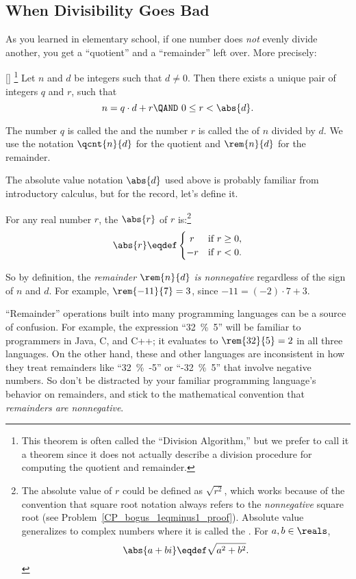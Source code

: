 \subsection{When Divisibility Goes Bad}

As you learned in elementary school, if one number does \emph{not}
evenly divide another, you get a ``quotient'' and a ``remainder'' left
over.  More precisely:
\begin{theorem}\label{division_thm}[]%
\footnote{This theorem is often called the ``Division Algorithm,'' but
  we prefer to call it a theorem since it does not actually describe
  a division procedure for computing the quotient and remainder.}  Let
$n$ and $d$ be integers such that $d \neq 0$.  Then there exists a unique
pair of integers $q$ and $r$, such that
\begin{equation}\label{nqdr}
n = q \cdot d + r \QAND\ 0 \leq r < \abs{d}.
\end{equation}
\end{theorem}
The number $q$ is called the  and the number $r$ is
called the  of $n$ divided by $d$.  We use the
notation $\qcnt{n}{d}$ for the quotient and $\rem{n}{d}$ for the
remainder.

The absolute value notation $\abs{d}$ used above is probably familiar
from introductory calculus, but for the record, let's define it.
\begin{definition}
For any real number $r$, the  $\abs{r}$ of $r$
is:\footnote{The absolute value of $r$ could be defined as
  $\sqrt{r^2}$, which works because of the convention that square root
  notation always refers to the \emph{nonnegative} square root (see
  Problem~\ref{CP_bogus_1eqminus1_proof}).  Absolute value generalizes
  to complex numbers where it is called the .  For $a,b \in
  \reals$,
\[
\abs{a+bi} \eqdef \sqrt{a^2+b^2}.
\]}
\[
\abs{r} \eqdef \begin{cases}
                \ r & \text{if $r \geq 0$},\\
                -r & \text{if $r < 0$}.
\end{cases}
\]
\end{definition}

So by definition, the \emph{remainder $\rem{n}{d}$ is nonnegative}
regardless of the sign of $n$ and $d$.  For example, $\rem{-11}{7} =
3$, since $-11 = (-2) \cdot 7 + 3$.

``Remainder'' operations built into many programming languages can be
a source of confusion.  For example, the expression ``32~\%~5'' will
be familiar to programmers in Java, C, and C++; it evaluates to
$\rem{32}{5} =2$ in all three languages.  On the other hand, these and
other languages are inconsistent in how they treat remainders like
``32~\%~-5'' or ``-32~\%~5'' that involve negative numbers.  So don't
be distracted by your familiar programming language's behavior on
remainders, and stick to the mathematical convention that
\emph{remainders are nonnegative}.

